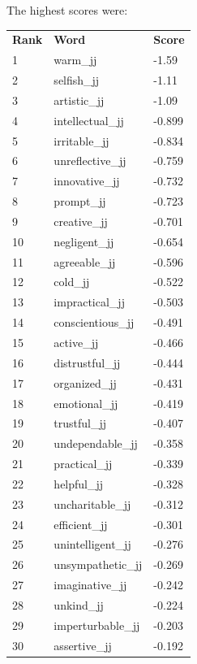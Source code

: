 \documentclass[10pt,letterpaper]{book}
\begin{document}
The highest scores were:
\begin{tabular}{ l l l }
        \textbf{Rank} & \textbf{Word} & \textbf{Score} \\
        1 & warm\_jj & -1.59 \\
        2 & selfish\_jj & -1.11 \\
        3 & artistic\_jj & -1.09 \\
        4 & intellectual\_jj & -0.899 \\
        5 & irritable\_jj & -0.834 \\
        6 & unreflective\_jj & -0.759 \\
        7 & innovative\_jj & -0.732 \\
        8 & prompt\_jj & -0.723 \\
        9 & creative\_jj & -0.701 \\
        10 & negligent\_jj & -0.654 \\
        11 & agreeable\_jj & -0.596 \\
        12 & cold\_jj & -0.522 \\
        13 & impractical\_jj & -0.503 \\
        14 & conscientious\_jj & -0.491 \\
        15 & active\_jj & -0.466 \\
        16 & distrustful\_jj & -0.444 \\
        17 & organized\_jj & -0.431 \\
        18 & emotional\_jj & -0.419 \\
        19 & trustful\_jj & -0.407 \\
        20 & undependable\_jj & -0.358 \\
        21 & practical\_jj & -0.339 \\
        22 & helpful\_jj & -0.328 \\
        23 & uncharitable\_jj & -0.312 \\
        24 & efficient\_jj & -0.301 \\
        25 & unintelligent\_jj & -0.276 \\
        26 & unsympathetic\_jj & -0.269 \\
        27 & imaginative\_jj & -0.242 \\
        28 & unkind\_jj & -0.224 \\
        29 & imperturbable\_jj & -0.203 \\
        30 & assertive\_jj & -0.192 \\
\end{tabular}
\end{document}
